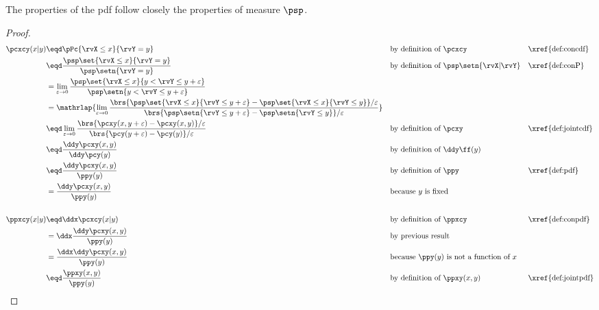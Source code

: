 The properties of the pdf follow closely the properties of measure $\psp$.
\begin{theorem}
\label{thm:conpdf}
\end{theorem}
\begin{proof}
\begin{align*}
  \pcxcy(x|y)
    &\eqd \pPc{\rvX\le x}{\rvY=y}
    &&    \text{by definition of $\pcxcy$}              &&\text{\xref{def:concdf}}
  \\&\eqd \frac{\psp\set{\rvX\le x}{\rvY=y}}{\psp\setn{\rvY=y}}
    &&    \text{by definition of $\psp\setn{\rvX|\rvY}$}         &&\text{\xref{def:conP}}
  \\&=    \lim_{\varepsilon\to0}\frac{\psp\set{\rvX\le x}{y<\rvY\le y+\varepsilon}}
                                         {\psp\setn{y<\rvY\le y+\varepsilon}}
  \\&=\mathrlap{\lim_{\varepsilon\to0}\frac{\brs{\psp\set{\rvX\le x}{\rvY\le y+\varepsilon}-\psp\set{\rvX\le x}{\rvY\le y}}/\varepsilon}
                                         {\brs{\psp\setn{\rvY\le y+\varepsilon}-\psp\setn{\rvY\le y}}/\varepsilon}}
  \\&\eqd \lim_{\varepsilon\to0}\frac{\brs{\pcxy(x,y+\varepsilon)-\pcxy(x,y)}/\varepsilon}
                                         {\brs{\pcy(y+\varepsilon)-\pcy(y)}/\varepsilon}
    &&    \text{by definition of $\pcxy$}                  &&\text{\xref{def:jointcdf}}
  \\&\eqd \frac{\ddy\pcxy(x,y)}{\ddy\pcy(y)}
    &&    \text{by definition of $\ddy\ff(y)$}
  \\&\eqd \frac{\ddy\pcxy(x,y)}{\ppy(y)}
    &&    \text{by definition of $\ppy$}  &&\text{\xref{def:pdf}}
  \\&=    \frac{\ddy\pcxy(x,y)}{\ppy(y)}
    &&    \text{because $y$ is fixed}
  \\
  \\
  \ppxcy(x|y)
    &\eqd \ddx\pcxcy(x|y)                     &&\text{by definition of $\ppxcy$}                  &&\text{\xref{def:conpdf}}
  \\&=    \ddx\frac{\ddy\pcxy(x,y)}{\ppy(y)}  &&\text{by previous result}
  \\&=    \frac{\ddx\ddy\pcxy(x,y)}{\ppy(y)}  &&\text{because $\ppy(y)$ is not a function of $x$}
  \\&\eqd \frac{\ppxy(x,y)}{\ppy(y)}          &&\text{by definition of $\ppxy(x,y)$}              &&\text{\xref{def:jointpdf}}
\end{align*}


\end{proof}
